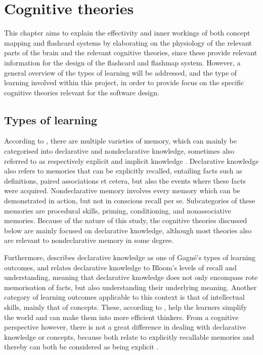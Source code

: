 \chapter{Cognitive theories}

\label{ch:theory}

This chapter aims to explain the effectivity and inner workings of both concept mapping and flashcard systems by elaborating on the physiology of the relevant parts of the brain and the relevant cognitive theories, since these provide relevant information for the design of the flashcard and flashmap system. However, a general overview of the types of learning will be addressed, and the type of learning involved within this project, in order to provide focus on the specific cognitive theories relevant for the software design.

\section{Types of learning}

According to , there are multiple varieties of memory, which can mainly be categorised into declarative and nondeclarative knowledge, sometimes also referred to as respectively explicit and implicit knowledge \cite{cognitivepsychology}. Declarative knowledge also refers to memories that can be explicitly recalled, entailing facts such as definitions, paired associations et cetera, but also the events where these facts were acquired. Nondeclarative memory involves every memory which can be demonstrated in action, but not in conscious recall per se. Subcategories of these memories are procedural skills, priming, conditioning, and nonassociative memories. Because of the nature of this study, the cognitive theories discussed below are mainly focused on declarative knowledge, although most theories also are relevant to nondeclarative memory in some degree.

Furthermore,  describes declarative knowledge as one of Gagné's types of learning outcomes, and relates declarative knowledge to Bloom's levels of recall and understanding, meaning that declarative knowledge does not only encompass rote memorisation of facts, but also understanding their underlying meaning. Another category of learning outcomes applicable to this context is that of intellectual skills, mainly that of concepts. These, according to , help the learners simplify the world and can make them into more efficient thinkers. From a cognitive perspective however, there is not a great difference in dealing with declarative knowledge or concepts, because both relate to explicitly recallable memories and thereby can both be considered as being explicit \cite{squire}.


